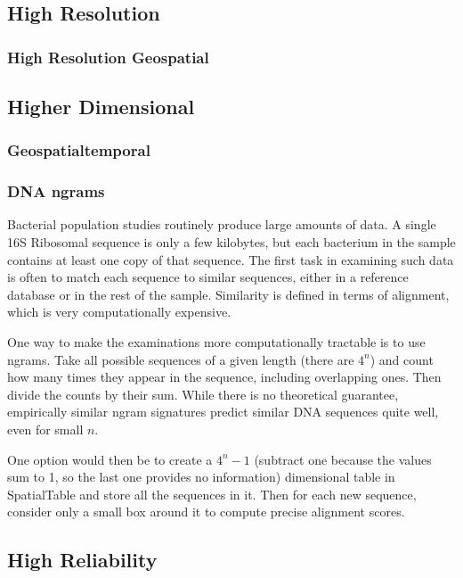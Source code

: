 \documentclass[11pt]{article}
\begin{document}
\subsection{High Resolution}

\subsubsection{High Resolution Geospatial}

\subsection{Higher Dimensional}

\subsubsection{Geospatialtemporal}

\subsubsection{DNA ngrams}

Bacterial population studies routinely produce large amounts of data.  A single 16S Ribosomal sequence is only a few kilobytes, but each bacterium in the sample contains at least one copy of that sequence.  The first task in examining such data is often to match each sequence to similar sequences, either in a reference database or in the rest of the sample.  Similarity is defined in terms of alignment, which is very computationally expensive.

One way to make the examinations more computationally tractable is to use ngrams.  Take all possible sequences of a given length (there are $4^n$) and count how many times they appear in the sequence, including overlapping ones.  Then divide the counts by their sum.  While there is no theoretical guarantee, empirically similar ngram signatures predict similar DNA sequences quite well, even for small $n$.\cite{dna}

One option would then be to create a $4^n-1$ (subtract one because the values sum to 1, so the last one provides no information) dimensional table in SpatialTable and store all the sequences in it.  Then for each new sequence, consider only a small box around it to compute precise alignment scores.

\subsection{High Reliability}
\end{document}
